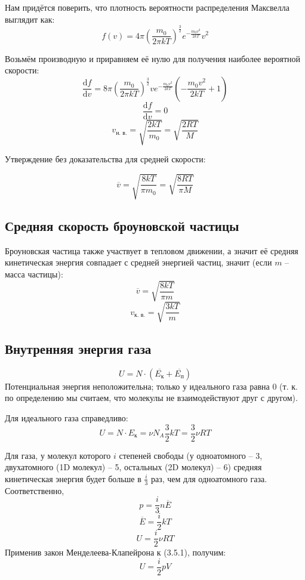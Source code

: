 
Нам придётся поверить, что плотность вероятности распределения Максвелла выглядит как:
\[f(v) = 4\pi(\frac{m_0}{2\pi k T})^{\frac{3}{2}}e^{-\frac{m_0v^2}{2 k T}}v^2\]

Возьмём производную и приравняем её нулю для получения наиболее вероятной скорости:
\[\frac{\text{d}f}{\text{d}v}=8\pi(\frac{m_0}{2\pi k T})^{\frac{3}{2}}ve^{-\frac{m_0v^2}{2 k T}}(-\frac{m_0 v^2}{2kT}+1)\]
\[\frac{\text{d}f}{\text{d}v}=0\]
\[v_{\text{н. в.}}=\sqrt{\frac{2kT}{m_0}}=\sqrt{\frac{2RT}{M}}\]

Утверждение без доказательства для средней скорости:\par
\[\overline{v}=\sqrt{\frac{8kT}{\pi m_0}}=\sqrt{\frac{8RT}{\pi M}}\]



\subsection{Средняя скорость броуновской частицы}
Броуновская частица также участвует в тепловом движении, а значит её средняя кинетическая энергия совпадает с средней энергией частиц, значит (если $m$ -- масса частицы):
\[\overline{v}=\sqrt{\frac{8kT}{\pi m}}\]
\[v_{\text{к. в.}}=\sqrt{\frac{3kT}{m}}\]



\subsection{Внутренняя энергия газа}
\[U=N \cdot (\overline{E_\text{к}}+\overline{E_\text{п}})\]
Потенциальная энергия неположительна; только у идеального газа равна 0 (т. к. по определению мы считаем, что молекулы не взаимодействуют друг с другом).\par

Для идеального газа справедливо:
\[U=N\cdot E_{\text{к}}=\nu N_A \frac{3}{2}kT=\frac{3}{2} \nu RT\]

Для газа, у молекул которого $i$ степеней свободы (у одноатомного -- 3, двухатомного (1D молекул) -- 5, остальных (2D молекул) -- 6) средняя кинетическая энергия будет больше в $\frac{i}{3}$ раз, чем для одноатомного газа. Соответственно,
\[ p = \frac{i}{3} n \overline{E} \]
\[ \overline{E}=\frac{i}{2}kT \]
\begin{equation}
U=\frac{i}{2}\nu RT
\end{equation}
Применив закон Менделеева-Клапейрона к (3.5.1), получим:
\begin{equation*}
U=\frac{i}{2}pV
\end{equation*}